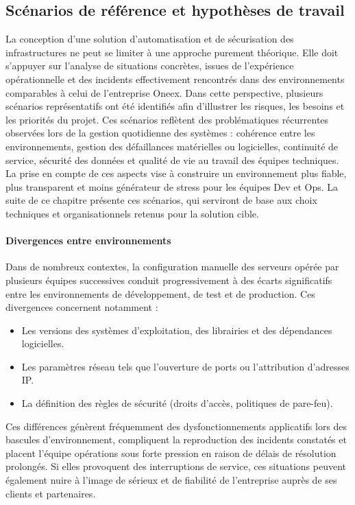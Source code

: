 \subsection{Scénarios de référence et hypothèses de travail}

La conception d’une solution d’automatisation et de sécurisation des infrastructures ne peut se limiter à une approche purement théorique. Elle doit s’appuyer sur l’analyse de situations concrètes, issues de l’expérience opérationnelle et des incidents effectivement rencontrés dans des environnements comparables à celui de l’entreprise Oneex.
Dans cette perspective, plusieurs scénarios représentatifs ont été identifiés afin d’illustrer les risques, les besoins et les priorités du projet.
Ces scénarios reflètent des problématiques récurrentes observées lors de la gestion quotidienne des systèmes : cohérence entre les environnements, gestion des défaillances matérielles ou logicielles, continuité de service, sécurité des données et qualité de vie au travail des équipes techniques. La prise en compte de ces aspects vise à construire un environnement plus fiable, plus transparent et moins générateur de stress pour les équipes Dev et Ops. La suite de ce chapitre présente ces scénarios, qui serviront de base aux choix techniques et organisationnels retenus pour la solution cible.

\paragraph{\textbf{Divergences entre environnements}}

Dans de nombreux contextes, la configuration manuelle des serveurs opérée par plusieurs équipes successives conduit progressivement à des écarts significatifs entre les environnements de développement, de test et de production. Ces divergences concernent notamment :

\begin{itemize}
	\item Les versions des systèmes d'exploitation, des librairies et des dépendances logicielles.
	\item Les paramètres réseau tels que l'ouverture de ports ou l'attribution d'adresses IP.
	\item La définition des règles de sécurité (droits d'accès, politiques de pare-feu).
\end{itemize}

Ces différences génèrent fréquemment des dysfonctionnements applicatifs lors des bascules d'environnement, compliquent la reproduction des incidents constatés et placent l’équipe opérations sous forte pression en raison de délais de résolution prolongés. Si elles provoquent des interruptions de service, ces situations peuvent également nuire à l’image de sérieux et de fiabilité de l’entreprise auprès de ses clients et partenaires.

